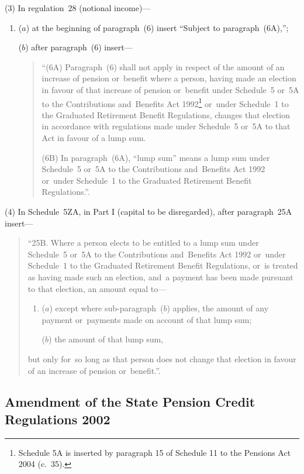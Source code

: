\documentclass[12pt,a4paper]{article}
\begin{document}
(3) In regulation~28 (notional income)—
\begin{enumerate}\item[]
\begin{sloppypar}
($a$) at the beginning of paragraph~(6) insert “Subject to paragraph~(6A),”;
\end{sloppypar}

($b$) after paragraph~(6) insert—
\begin{quotation}
“(6A) Paragraph~(6) shall not apply in respect of the amount of an increase of pension or~benefit where a person, having made an election in favour of that increase of pension or~benefit under Schedule~5 or~5A to the Contributions and~Benefits Act 1992\footnote{Schedule 5A is inserted by paragraph 15 of Schedule 11 to the Pensions Act 2004 (c.~35).} or~under Schedule~1 to the Graduated Retirement Benefit Regulations, changes that election in accordance with regulations made under Schedule~5 or~5A to that Act in favour of a lump sum.

(6B) In paragraph~(6A), “lump sum” means a lump sum under Schedule~5 or~5A to the Contributions and~Benefits Act 1992 or~under Schedule~1 to the Graduated Retirement Benefit Regulations.”.
\end{quotation}
\end{enumerate}

(4) In Schedule~5ZA, in Part I (capital to be disregarded), after paragraph~25A insert—
\begin{quotation}
“25B.  Where a person elects to be entitled to a lump sum under Schedule~5 or~5A to the Contributions and~Benefits Act 1992 or~under Schedule~1 to the Graduated Retirement Benefit Regulations, or~is treated as having made such an election, and~a payment has been made pursuant to that election, an amount equal to—
\begin{enumerate}\item[]
($a$) except where sub-paragraph~($b$)  applies, the amount of any payment or~payments made on account of that lump sum;

($b$) the amount of that lump sum,
\end{enumerate}
but only for~so long as that person does not change that election in favour of an increase of pension or~benefit.”.
\end{quotation}

\subsection[13. Amendment of the State Pension Credit Regulations 2002]{Amendment of the State Pension Credit Regulations 2002}
\end{document}
